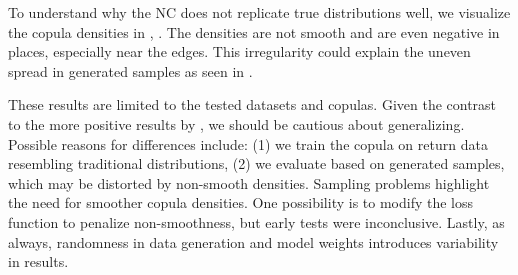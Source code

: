 To understand why the \gls{NC} does not replicate true distributions well, we visualize the copula densities in , . The densities are not smooth and are even negative in places, especially near the edges. This irregularity could explain the uneven spread in generated samples as seen in .

These results are limited to the tested datasets and copulas. Given the contrast to the more positive results by \citet[pp.~17-18]{ZengWang2022}, we should be cautious about generalizing. Possible reasons for differences include: (1) we train the copula on return data resembling traditional distributions, (2) we evaluate based on generated samples, which may be distorted by non-smooth densities. Sampling problems highlight the need for smoother copula densities. One possibility is to modify the loss function to penalize non-smoothness, but early tests were inconclusive. Lastly, as always, randomness in data generation and model weights introduces variability in results.















